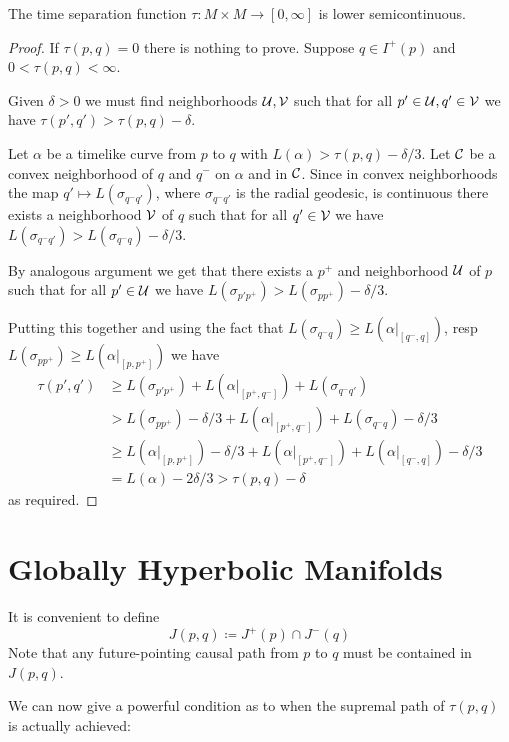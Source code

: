 \begin{lemma}
The time separation function $\tau:M\times M \to [0,\infty]$ is lower semicontinuous.
\end{lemma}
\begin{proof}
If $\tau(p,q)=0$ there is nothing to prove. Suppose $q\in I^+(p)$ and $0<\tau(p,q)<\infty$.

Given $\delta>0$ we must find neighborhoods $\mathcal{U},\mathcal{V}$ such that for all $p'\in\mathcal{U}, q'\in\mathcal{V}$ we have $\tau(p',q') > \tau(p,q) - \delta$.

Let $\alpha$ be a timelike curve from $p$ to $q$ with $L(\alpha)>\tau(p,q)-\delta/3$. Let $\mathcal{C}$ be a convex neighborhood of $q$ and $q^-$ on $\alpha$ and in $\mathcal{C}$. Since in convex neighborhoods the map $q'\mapsto L(\sigma_{q^-q'})$, where $\sigma_{q^-q'}$ is the radial geodesic, is continuous there exists a neighborhood $\mathcal{V}$ of $q$ such that for all $q'\in \mathcal{V}$ we have $L(\sigma_{q^-q'})>L(\sigma_{q^-q})-\delta/3$.

By analogous argument we get that there exists a $p^+$ and neighborhood $\mathcal{U}$ of $p$ such that for all $p'\in \mathcal{U}$ we have $L(\sigma_{p'p^+})>L(\sigma_{pp^+})-\delta/3$.

Putting this together and using the fact that $L(\sigma_{q^-q})\ge L(\alpha\rvert_{[q^-,q]})$, resp $L(\sigma_{pp^+})\ge L(\alpha\rvert_{[p,p^+]})$ we have 
\begin{align*}
\tau(p',q') &\ge L(\sigma_{p'p^+})+L(\alpha\rvert_{\left[p^+,q^-\right]})+L(\sigma_{q^-q'}) \\
&>L(\sigma_{pp^+}) -\delta/3 + L(\alpha\rvert_{\left[p^+,q^-\right]}) + L(\sigma_{q^-q}) - \delta/3 \\
&\ge L(\alpha\rvert_{[p,p^+]}) -\delta/3 + L(\alpha\rvert_{\left[p^+,q^-\right]}) + L(\alpha\rvert_{[q^-,q]}) - \delta/3\\ 
&= L(\alpha) - 2\delta/3 > \tau(p,q) - \delta
\end{align*}
as required.
\end{proof}

\section{Globally Hyperbolic Manifolds}
It is convenient to define 
\[
J(p,q) \coloneqq J^+(p) \cap J^-(q)
\]
Note that any future-pointing causal path from $p$ to $q$ must be contained in $J(p,q)$.

We can now give a powerful condition as to when the supremal path of $\tau(p,q)$ is actually achieved:

